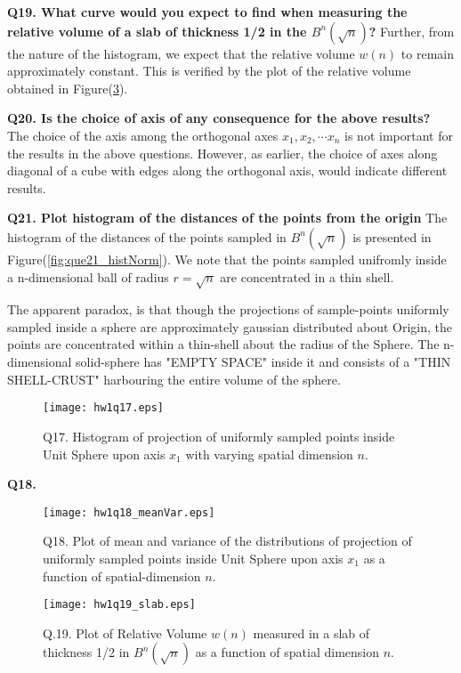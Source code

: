 \documentclass[11pt]{article}
\begin{document}
   \textbf{Q19. What curve would you expect to find when measuring the relative volume of a slab of thickness 1/2 in the $B^n(\sqrt{n})$?}
Further, from the nature of the histogram, we expect that the relative volume $w(n)$ to remain approximately constant. 
This is verified by the plot of the relative volume obtained in Figure(\ref{fig:que19}).

\textbf{Q20. Is the choice of axis of any consequence for the above results?}
The choice of the axis among the orthogonal axes $x_1, x_2, \cdots x_n$ is not important for the results in the above questions. However, as earlier, the choice of axes along diagonal of a cube with edges along the orthogonal axis, would indicate different results. 

\textbf{Q21. Plot histogram of the distances of the points from the origin}
The histogram of the distances of the points sampled in $B^n(\sqrt{n})$ is presented in Figure(\ref{fig:que21_histNorm}). We note that the points sampled unifromly inside a n-dimensional ball of radius $r =\sqrt{n}$ are concentrated in a thin shell. 

The apparent paradox, is that though the projections of sample-points uniformly sampled inside a sphere are approximately gaussian distributed about Origin, the points are concentrated within a thin-shell about the radius of the Sphere. The n-dimensional solid-sphere has "EMPTY SPACE" inside it and consists of a "THIN SHELL-CRUST" harbouring the entire volume of the sphere. 


\begin{figure}[h!]
\centering
\texttt{[image: hw1q17.eps]}\\
\caption{Q17. Histogram of projection of uniformly sampled points inside Unit Sphere upon axis $x_1$ with varying spatial dimension $n$.}
\label{fig:que17}
\end{figure}

 
  \textbf{Q18. }
 \begin{figure}[h!]
\centering
\texttt{[image: hw1q18\_meanVar.eps]}\\
\caption{Q18. Plot of mean and variance of the distributions of projection of uniformly sampled points inside Unit Sphere upon axis $x_1$ as a function of spatial-dimension $n$.}
\label{fig:que18}
\end{figure}

  


   

\begin{figure}[h!]
\centering
\texttt{[image: hw1q19\_slab.eps]}\\
\caption{Q.19. Plot of Relative Volume $w(n)$ measured in a slab of thickness 1/2 in $B^n(\sqrt{n})$ as a function of spatial dimension $n$.}
\label{fig:que19}
\end{figure}
\end{document}
